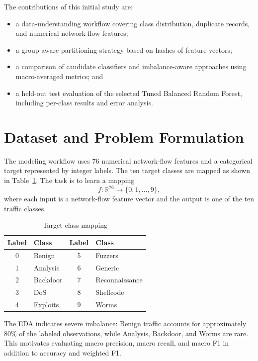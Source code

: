 \documentclass[conference]{IEEEtran}
\begin{document}
The contributions of this initial study are:
\begin{itemize}
    \item a data-understanding workflow covering class distribution, duplicate records, and numerical network-flow features;
    \item a group-aware partitioning strategy based on hashes of feature vectors;
    \item a comparison of candidate classifiers and imbalance-aware approaches using macro-averaged metrics; and
    \item a held-out test evaluation of the selected Tuned Balanced Random Forest, including per-class results and error analysis.
\end{itemize}

\section{Dataset and Problem Formulation}
The modeling workflow uses 76 numerical network-flow features and a categorical target represented by integer labels. The ten target classes are mapped as shown in Table~\ref{tab:classes}. The task is to learn a mapping
\begin{equation}
    f: \mathbb{R}^{76} \rightarrow \{0,1,\ldots,9\},
\end{equation}
where each input is a network-flow feature vector and the output is one of the ten traffic classes.

\begin{table}[t]
\caption{Target-class mapping}
\label{tab:classes}
\centering
\begin{tabular}{cl|cl}
\toprule
Label & Class & Label & Class\\
\midrule
0 & Benign & 5 & Fuzzers\\
1 & Analysis & 6 & Generic\\
2 & Backdoor & 7 & Reconnaissance\\
3 & DoS & 8 & Shellcode\\
4 & Exploits & 9 & Worms\\
\bottomrule
\end{tabular}
\end{table}

The EDA indicates severe imbalance: Benign traffic accounts for approximately 80\% of the labeled observations, while Analysis, Backdoor, and Worms are rare. This motivates evaluating macro precision, macro recall, and macro F1 in addition to accuracy and weighted F1.
\end{document}
